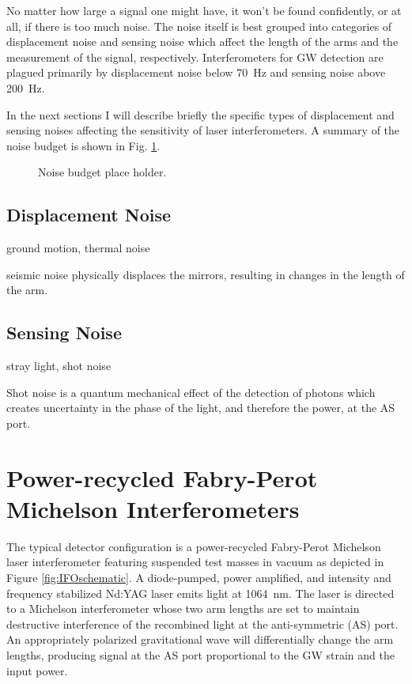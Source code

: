 No matter how large a signal one might have, it won't be found
confidently, or at all, if there is too much noise. The noise itself
is best grouped into categories of displacement noise and sensing
noise which affect the length of the arms and the measurement of the
signal, respectively. Interferometers for GW detection are plagued
primarily by displacement noise below 70~Hz and sensing noise above
200~Hz.

In the next sections I will describe briefly the specific types of
displacement and sensing noises affecting the sensitivity of laser
interferometers. A summary of the noise budget is shown in
Fig. \ref{fig:NB}. 


\begin{figure}
\begin{centering}
\caption[LIGO noise budget]{Noise budget place holder.}
\label{fig:NB}
\end{centering}
\end{figure}


\subsection{Displacement Noise} 
ground motion, thermal noise

seismic noise physically displaces the mirrors, resulting in changes in the length
of the arm. 

\subsection{Sensing Noise}
stray light, shot noise

Shot noise is a quantum mechanical effect of the detection
of photons which creates uncertainty in the phase of the light, and
therefore the power, at the AS port.




\section{Power-recycled Fabry-Perot Michelson Interferometers}
The typical detector configuration is a power-recycled Fabry-Perot
Michelson laser interferometer featuring suspended test masses in
vacuum as depicted in Figure \ref{fig:IFOschematic}. A diode-pumped,
power amplified, and intensity and frequency stabilized Nd:YAG laser
emits light at 1064~nm. The laser is directed to a Michelson
interferometer whose two arm lengths are set to maintain destructive
interference of the recombined light at the anti-symmetric (AS)
port. An appropriately polarized gravitational wave will
differentially change the arm lengths, producing signal at the AS port
proportional to the GW strain and the input power. 

